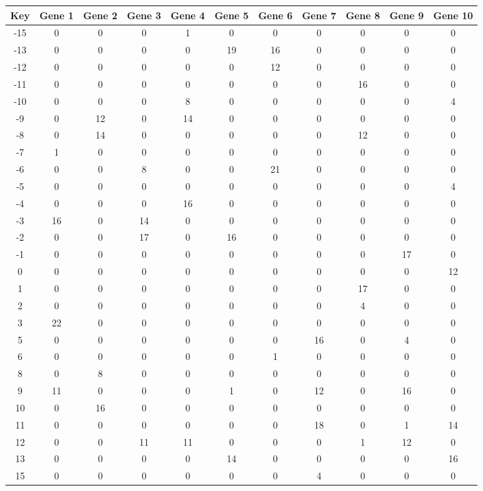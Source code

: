 \begin{tabular}{|c|c|c|c|c|c|c|c|c|c|c|}
\hline
Key & Gene 1 & Gene 2 & Gene 3 & Gene 4 & Gene 5 & Gene 6 & Gene 7 & Gene 8 & Gene 9 & Gene 10 \\
\hline
-15 & 0 & 0 & 0 & 1 & 0 & 0 & 0 & 0 & 0 & 0 \\
-13 & 0 & 0 & 0 & 0 & 19 & 16 & 0 & 0 & 0 & 0 \\
-12 & 0 & 0 & 0 & 0 & 0 & 12 & 0 & 0 & 0 & 0 \\
-11 & 0 & 0 & 0 & 0 & 0 & 0 & 0 & 16 & 0 & 0 \\
-10 & 0 & 0 & 0 & 8 & 0 & 0 & 0 & 0 & 0 & 4 \\
-9 & 0 & 12 & 0 & 14 & 0 & 0 & 0 & 0 & 0 & 0 \\
-8 & 0 & 14 & 0 & 0 & 0 & 0 & 0 & 12 & 0 & 0 \\
-7 & 1 & 0 & 0 & 0 & 0 & 0 & 0 & 0 & 0 & 0 \\
-6 & 0 & 0 & 8 & 0 & 0 & 21 & 0 & 0 & 0 & 0 \\
-5 & 0 & 0 & 0 & 0 & 0 & 0 & 0 & 0 & 0 & 4 \\
-4 & 0 & 0 & 0 & 16 & 0 & 0 & 0 & 0 & 0 & 0 \\
-3 & 16 & 0 & 14 & 0 & 0 & 0 & 0 & 0 & 0 & 0 \\
-2 & 0 & 0 & 17 & 0 & 16 & 0 & 0 & 0 & 0 & 0 \\
-1 & 0 & 0 & 0 & 0 & 0 & 0 & 0 & 0 & 17 & 0 \\
0 & 0 & 0 & 0 & 0 & 0 & 0 & 0 & 0 & 0 & 12 \\
1 & 0 & 0 & 0 & 0 & 0 & 0 & 0 & 17 & 0 & 0 \\
2 & 0 & 0 & 0 & 0 & 0 & 0 & 0 & 4 & 0 & 0 \\
3 & 22 & 0 & 0 & 0 & 0 & 0 & 0 & 0 & 0 & 0 \\
5 & 0 & 0 & 0 & 0 & 0 & 0 & 16 & 0 & 4 & 0 \\
6 & 0 & 0 & 0 & 0 & 0 & 1 & 0 & 0 & 0 & 0 \\
8 & 0 & 8 & 0 & 0 & 0 & 0 & 0 & 0 & 0 & 0 \\
9 & 11 & 0 & 0 & 0 & 1 & 0 & 12 & 0 & 16 & 0 \\
10 & 0 & 16 & 0 & 0 & 0 & 0 & 0 & 0 & 0 & 0 \\
11 & 0 & 0 & 0 & 0 & 0 & 0 & 18 & 0 & 1 & 14 \\
12 & 0 & 0 & 11 & 11 & 0 & 0 & 0 & 1 & 12 & 0 \\
13 & 0 & 0 & 0 & 0 & 14 & 0 & 0 & 0 & 0 & 16 \\
15 & 0 & 0 & 0 & 0 & 0 & 0 & 4 & 0 & 0 & 0 \\
\hline
\end{tabular}